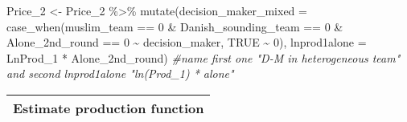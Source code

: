 \documentclass[
]{article}
\newenvironment{Shaded}{\begin{snugshade}}{\end{snugshade}}
\newcommand{\AttributeTok}[1]{\textcolor[rgb]{0.77,0.63,0.00}{#1}}
\newcommand{\CommentTok}[1]{\textcolor[rgb]{0.56,0.35,0.01}{\textit{#1}}}
\newcommand{\ConstantTok}[1]{\textcolor[rgb]{0.00,0.00,0.00}{#1}}
\newcommand{\DecValTok}[1]{\textcolor[rgb]{0.00,0.00,0.81}{#1}}
\newcommand{\FunctionTok}[1]{\textcolor[rgb]{0.00,0.00,0.00}{#1}}
\newcommand{\NormalTok}[1]{#1}
\newcommand{\OtherTok}[1]{\textcolor[rgb]{0.56,0.35,0.01}{#1}}
\newcommand{\SpecialCharTok}[1]{\textcolor[rgb]{0.00,0.00,0.00}{#1}}
\begin{document}
\begin{Shaded}
\begin{Highlighting}[]
\NormalTok{Price\_2 }\OtherTok{\textless{}{-}}\NormalTok{ Price\_2 }\SpecialCharTok{\%\textgreater{}\%}
  \FunctionTok{mutate}\NormalTok{(}\AttributeTok{decision\_maker\_mixed =} \FunctionTok{case\_when}\NormalTok{(muslim\_team }\SpecialCharTok{==} \DecValTok{0} \SpecialCharTok{\&}\NormalTok{ Danish\_sounding\_team }\SpecialCharTok{==} \DecValTok{0} \SpecialCharTok{\&}\NormalTok{ Alone\_2nd\_round }\SpecialCharTok{==} \DecValTok{0} \SpecialCharTok{\textasciitilde{}}\NormalTok{ decision\_maker, }\ConstantTok{TRUE} \SpecialCharTok{\textasciitilde{}} \DecValTok{0}\NormalTok{),}
         \AttributeTok{lnprod1alone =}\NormalTok{ LnProd\_1 }\SpecialCharTok{*}\NormalTok{ Alone\_2nd\_round)}
\CommentTok{\#name first one "D{-}M in heterogeneous team" and second lnprod1alone "ln(Prod\_1) * alone"}
\end{Highlighting}
\end{Shaded}

\begin{longtable}[]{@{}c@{}}
\toprule
\endhead
Estimate production function \\
\bottomrule
\end{longtable}
\end{document}
